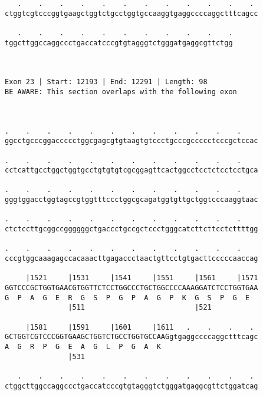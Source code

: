 \documentclass{article}
\begin{document}
\begin{Verbatim}
   .    .    .    .    .    .    .    .    .    .    .    . 
ctggtcgtcccggtgaagctggtctgcctggtgccaaggtgaggccccaggctttcagcc
                                                            
   .    .    .    .    .    .    .    .    .    .    .
tggcttggccaggccctgaccatcccgtgtagggtctgggatgaggcgttctgg
                                                      
                                                      
 
Exon 23 | Start: 12193 | End: 12291 | Length: 98
BE AWARE: This section overlaps with the following exon



.    .    .    .    .    .    .    .    .    .    .    .    
ggcctgcccggaccccctggcgagcgtgtaagtgtccctgcccgccccctcccgctccac
                                                            
.    .    .    .    .    .    .    .    .    .    .    .    
cctcattgcctggctggtgcctgtgtgtcgcggagttcactggcctcctctcctcctgca
                                                            
.    .    .    .    .    .    .    .    .    .    .    .    
gggtggacctggtagccgtggtttccctggcgcagatggtgttgctggtcccaaggtaac
                                                            
.    .    .    .    .    .    .    .    .    .    .    .    
ctctccttgcggccggggggctgaccctgccgctccctgggcatcttcttcctcttttgg
                                                            
.    .    .    .    .    .    .    .    .    .    .    .    
cccgtggcaaagagccacaaacttgagaccctaactgttcctgtgacttcccccaaccag
                                                            
     |1521     |1531     |1541     |1551     |1561     |1571
GGTCCCGCTGGTGAACGTGGTTCTCCTGGCCCTGCTGGCCCCAAAGGATCTCCTGGTGAA
G  P  A  G  E  R  G  S  P  G  P  A  G  P  K  G  S  P  G  E  
               |511                          |521           
  
     |1581     |1591     |1601     |1611   .    .    .    . 
GCTGGTCGTCCCGGTGAAGCTGGTCTGCCTGGTGCCAAGgtgaggccccaggctttcagc
A  G  R  P  G  E  A  G  L  P  G  A  K                       
               |531                                         
  
   .    .    .    .    .    .    .    .    .    .    .    . 
ctggcttggccaggccctgaccatcccgtgtagggtctgggatgaggcgttctggatcag
                                                            

\end{Verbatim}
\end{document}
